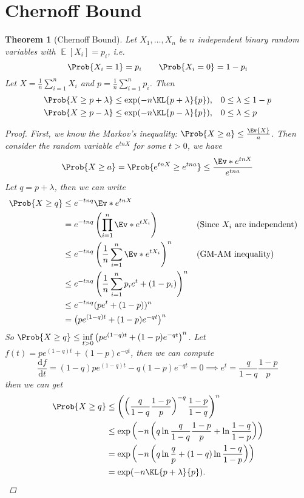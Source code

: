 \documentclass[a4paper]{article}
\DeclareMathOperator{\Eb}{\mathbb{E}}
\theoremstyle{mystyle}
\newtheorem{theorem}{Theorem}
\begin{document}
\section{Chernoff Bound}
\begin{theorem}[Chernoff Bound]
  Let $X_1, \dots, X_n$ be $n$ independent binary random variables with
  $\Eb[X_i] = p_i$, i.e.
  \[
      \Prob{X_i = 1} = p_i \qquad \Prob{X_i = 0} = 1 - p_i
  \]
  Let $X = \frac{1}{n} \sum_{i=1}^n X_i$ and $p = \frac{1}{n} \sum_{i=1}^n p_i$.
  Then
  \begin{align*}
    \Prob{ X \ge p + \lambda } \le \exp(-n \KL{p+\lambda}{p}), & \quad
    0 \le \lambda \le 1 - p \\
    \Prob{ X \ge p - \lambda } \le \exp(-n \KL{p-\lambda}{p}), & \quad
    0 \le \lambda \le p
  \end{align*}

  \begin{proof}
    First, we know the Markov's inequality: $\Prob{X \ge a} \le \frac{\Ev{X}}{a}$.
    Then consider the random variable $e^{tnX}$ for some $t > 0$, we have
    \[
      \Prob{X \ge a} = \Prob{e^{tnX} \ge e^{tna}} \le \frac{\Ev*{e^{tnX}}}{e^{tna}}
    \]
    Let $q = p + \lambda$, then we can write
    \begin{align*}
      \Prob{X \ge q} &\le e^{-tnq} \Ev*{e^{tnX}} \\
                     &= e^{-tnq} \left( \prod_{i=1}^n \Ev*{e^{tX_i}} \right)
                     && \text{(Since $X_i$ are independent)}\\
                     &\le e^{-tnq} \left(\frac{1}{n} \sum_{i=1}^n \Ev*{e^{tX_i}} \right)^n
                     && \text{(GM-AM inequality)}\\
                     &\le e^{-tnq} \left(\frac{1}{n} \sum_{i=1}^n p_i e^t + (1 - p_i) \right)^n \\
                     &\le e^{-tnq} (p e^t + (1 - p))^n \\
                     &= \big(p e^{(1-q)t} + (1-p)e^{-qt}\big)^n
    \end{align*}
    So $\Prob{X \ge q} \le \inf\limits_{t > 0} \big(p e^{(1-q)t} + (1-p)e^{-qt}\big)^n$.
    Let $f(t) = p e^{(1-q)t} + (1-p)e^{-qt}$, then we can compute
    \[
      \frac{\mathrm{d} f}{\mathrm{d} t}
      = (1-q)p e^{(1-q)t} - q(1-p)e^{-qt} = 0
      \implies 
      e^t = \frac{q}{1-q}\frac{1-p}{p}
    \]
    then we can get
    \begin{align*}
      \Prob{X \ge q}
      &\le \left(\left(\frac{q}{1-q}\frac{1-p}{p} \right)^{-q} \frac{1-p}{1-q}\right)^n \\
      &\le \exp \left( -n \left( q \ln \frac{q}{1-q}\frac{1-p}{p} + \ln \frac{1-q}{1-p} \right)\right)\\
      &= \exp \left( -n \left( q \ln \frac{q}{p} + (1-q) \ln \frac{1-q}{1-p} \right)\right)\\
      &= \exp(-n \KL{p+\lambda}{p}).
      \qedhere
    \end{align*}
  \end{proof}
\end{theorem}
\end{document}
